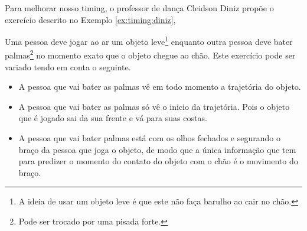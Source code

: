 Para melhorar nosso timing, o professor de dança Cleidson Diniz propõe \cite{TimingTreino1} 
o exercício descrito no Exemplo \ref{ex:timing:diniz},
\begin{example}
\label{ex:timing:diniz}
Uma pessoa deve jogar ao ar um objeto leve\footnote{A ideia de usar um objeto leve 
é que este não faça barulho ao cair no chão.} 
enquanto outra pessoa deve bater palmas\footnote{Pode ser trocado por uma pisada forte.} 
no momento exato que o objeto chegue ao chão.
Este exercício pode ser variado tendo em conta o seguinte.
\begin{itemize}
\item A pessoa que vai bater as palmas vê em todo momento a trajetória do objeto.
\item A pessoa que vai bater as palmas só vê o inicio da trajetória. 
Pois o objeto que é jogado sai da sua frente e vá para suas costas.
\item A pessoa que vai bater palmas está com os olhos fechados
e segurando o braço da pessoa que joga o objeto,
de modo que a única informação que tem 
para predizer o momento do contato do objeto com o chão 
é o movimento do braço. 
\end{itemize}
\vspace{-10pt}
\end{example}




